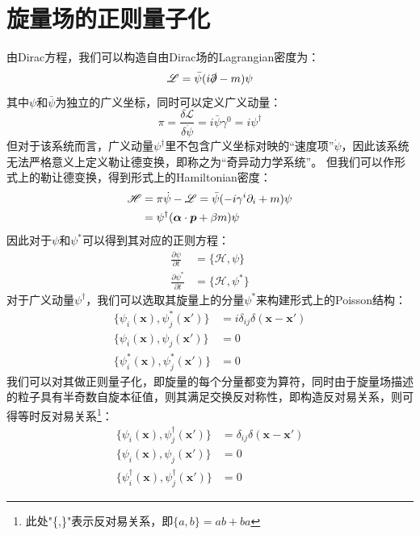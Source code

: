 \section{旋量场的正则量子化}
\par 由Dirac方程，我们可以构造自由Dirac场的Lagrangian密度为：
\begin{equation}
\mathscr{L}=\bar{\psi}(i\slashed{\partial}-m)\psi
\end{equation}
其中$\psi$和$\bar{\psi}$为独立的广义坐标，同时可以定义广义动量：
\begin{equation}
\pi=\frac{\delta\mathcal{L}}{\delta\dot{\psi}}=i\bar{\psi}\gamma^0=i\psi^\dagger
\end{equation}
但对于该系统而言，广义动量$\psi^\dagger$里不包含广义坐标对映的“速度项”$\dot{\psi}$，因此该系统无法严格意义上定义勒让德变换，即称之为“奇异动力学系统”。
但我们可以作形式上的勒让德变换，得到形式上的Hamiltonian密度：
\begin{align}
\mathscr{H}&=\pi\dot{\psi}-\mathscr{L}=\bar{\psi}(-i\gamma^i\partial_i+m)\psi\notag\\&=\psi^\dagger(\boldsymbol{\alpha}\cdot\boldsymbol{p}+\beta m)\psi
\end{align}
因此对于$\psi$和$\psi^*$可以得到其对应的正则方程：
\begin{equation}
\begin{split}
\frac{\partial\psi}{\partial t}&=\{\mathcal{H},\psi\}\\
\frac{\partial\psi^*}{\partial t}&=\{\mathcal{H},\psi^*\}
\end{split}
\end{equation}
对于广义动量$\psi^\dagger$，我们可以选取其旋量上的分量$\psi^*$来构建形式上的Poisson结构：
\begin{equation}
\begin{split}
\{\psi_i(\boldsymbol{x}),\psi_j^*(\boldsymbol{x'})\}&=i\delta_{ij}\delta(\boldsymbol{x}-\boldsymbol{x}')\\
\{\psi_i(\boldsymbol{x}),\psi_j(\boldsymbol{x'})\}&=0\\
\{\psi_i^*(\boldsymbol{x}),\psi_j^*(\boldsymbol{x'})\}&=0
\end{split}
\end{equation}
我们可以对其做正则量子化，即旋量的每个分量都变为算符，同时由于旋量场描述的粒子具有半奇数自旋本征值，则其满足交换反对称性，即构造反对易关系，则可得等时反对易关系\footnote{此处"\{,\}"表示反对易关系，即$\{a,b\}=ab+ba$}：
\begin{equation}
\begin{split}
\{\psi_i(\boldsymbol{x}),\psi_j^\dagger(\boldsymbol{x'})\}&=\delta_{ij}\delta(\boldsymbol{x}-\boldsymbol{x}')\\
\{\psi_i(\boldsymbol{x}),\psi_j(\boldsymbol{x'})\}&=0\\
\{\psi_i^\dagger(\boldsymbol{x}),\psi_j^\dagger(\boldsymbol{x'})\}&=0
\end{split}\end{equation}
